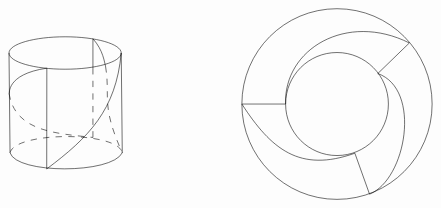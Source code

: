 \documentclass{article}
\begin{document}
\begin{example}
\[\begin{tikzpicture}[x=0.75pt,y=0.75pt,yscale=-1,xscale=1]
\draw   (360,149.06) .. controls (360,121.96) and (381.96,100) .. (409.06,100) .. controls (436.15,100) and (458.11,121.96) .. (458.11,149.06) .. controls (458.11,176.15) and (436.15,198.11) .. (409.06,198.11) .. controls (381.96,198.11) and (360,176.15) .. (360,149.06) -- cycle ;
\draw   (318.26,149.06) .. controls (318.26,98.91) and (358.91,58.26) .. (409.06,58.26) .. controls (459.2,58.26) and (499.85,98.91) .. (499.85,149.06) .. controls (499.85,199.2) and (459.2,239.85) .. (409.06,239.85) .. controls (358.91,239.85) and (318.26,199.2) .. (318.26,149.06) -- cycle ;
\draw    (318.26,149.06) -- (360,149.06) ;
\draw    (448,120) -- (478.11,90.89) ;
\draw    (426.11,195.89) -- (440.11,234.89) ;
\draw    (360,149.06) .. controls (358,96.89) and (418.11,60.89) .. (478.11,90.89) ;
\draw    (448,120) .. controls (490.11,134.89) and (475.11,220.89) .. (440.11,234.89) ;
\draw    (318.26,149.06) .. controls (346.11,191.89) and (373.22,214.78) .. (426.11,195.89) ;
\draw   (96,100.44) .. controls (96,91.91) and (119.98,85) .. (149.56,85) .. controls (179.13,85) and (203.11,91.91) .. (203.11,100.44) .. controls (203.11,108.97) and (179.13,115.89) .. (149.56,115.89) .. controls (119.98,115.89) and (96,108.97) .. (96,100.44) -- cycle ;
\draw    (97,195.44) .. controls (103.11,215.89) and (194.11,215.89) .. (204.11,195.44) ;
\draw  [dash pattern={on 4.5pt off 4.5pt}]  (97,195.44) .. controls (102.11,174.89) and (200.11,174.89) .. (204.11,195.44) ;
\draw    (96,100.44) -- (97,195.44) ;
\draw    (203.11,100.44) -- (204.11,195.44) ;
\draw    (132.11,114.89) -- (132,210.89) ;
\draw    (176.11,86.89) -- (176.11,114.89) ;
\draw  [dash pattern={on 4.5pt off 4.5pt}]  (176.11,114.89) -- (176.11,180.89) ;
\draw    (132.11,114.89) .. controls (92.11,120.89) and (97.11,139.89) .. (96,139) ;
\draw  [dash pattern={on 4.5pt off 4.5pt}]  (96,139) .. controls (102.11,174.89) and (139.11,176.89) .. (176.11,180.89) ;
\draw    (188.11,112.89) .. controls (187.11,109.89) and (186.11,97.89) .. (176.11,86.89) ;
\draw  [dash pattern={on 4.5pt off 4.5pt}]  (188.11,112.89) .. controls (193.11,142.89) and (183.11,148.89) .. (204.11,195.44) ;
\draw    (132,210.89) .. controls (172,180.89) and (198.11,154.89) .. (203.11,100.44) ;


\end{tikzpicture}\]
\end{example}
\end{document}
